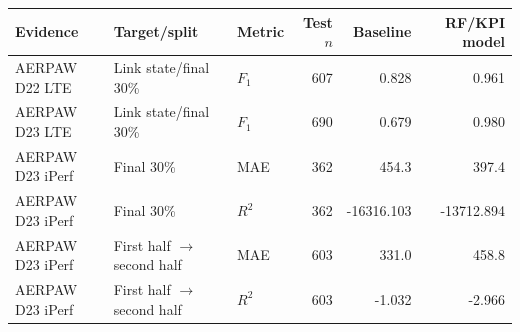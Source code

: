 \begin{tabular}{lllrrr}
\toprule
Evidence & Target/split & Metric & Test $n$ & Baseline & RF/KPI model \\
\midrule
AERPAW D22 LTE & Link state/final 30\% & $F_1$ & 607 & 0.828 & 0.961 \\
AERPAW D23 LTE & Link state/final 30\% & $F_1$ & 690 & 0.679 & 0.980 \\
AERPAW D23 iPerf & Final 30\% & MAE & 362 & 454.3 & 397.4 \\
AERPAW D23 iPerf & Final 30\% & $R^2$ & 362 & -16316.103 & -13712.894 \\
AERPAW D23 iPerf & First half $\rightarrow$ second half & MAE & 603 & 331.0 & 458.8 \\
AERPAW D23 iPerf & First half $\rightarrow$ second half & $R^2$ & 603 & -1.032 & -2.966 \\
\bottomrule
\end{tabular}
